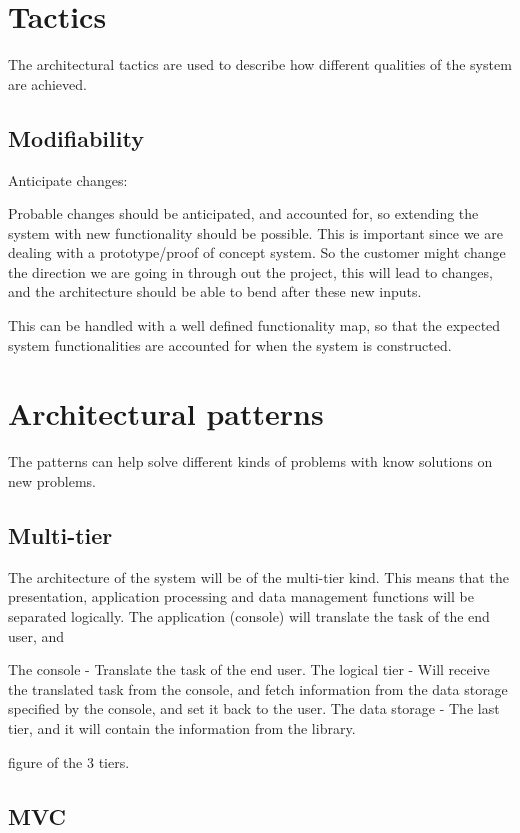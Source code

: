 \section{Tactics}
The architectural tactics are used to describe how different qualities of the system are achieved. 

\subsection{Modifiability}
Anticipate changes:

Probable changes should be anticipated, and accounted for, so extending the system with new functionality should be possible. This is important since we are dealing with a prototype/proof of concept system. So the customer might change the direction we are going in through out the project, this will lead to changes, and the architecture should be able to bend after these new inputs. 

This can be handled with a well defined functionality map, so that the expected system functionalities are accounted for when the system is constructed. 


\section{Architectural patterns}
The patterns can help solve different kinds of problems with know solutions on new problems.

\subsection{Multi-tier}

The architecture of the system will be of the multi-tier kind. This means that the presentation, application processing and data management functions will be separated logically. The application (console) will translate the task of the end user, and 

The console - Translate the task of the end user.
The logical tier - Will receive the translated task from the console, and fetch information from the data storage specified by the console, and set it back to the user.
The data storage - The last tier, and it will contain the information from the library.

figure of the 3 tiers. 

\subsection{MVC}

